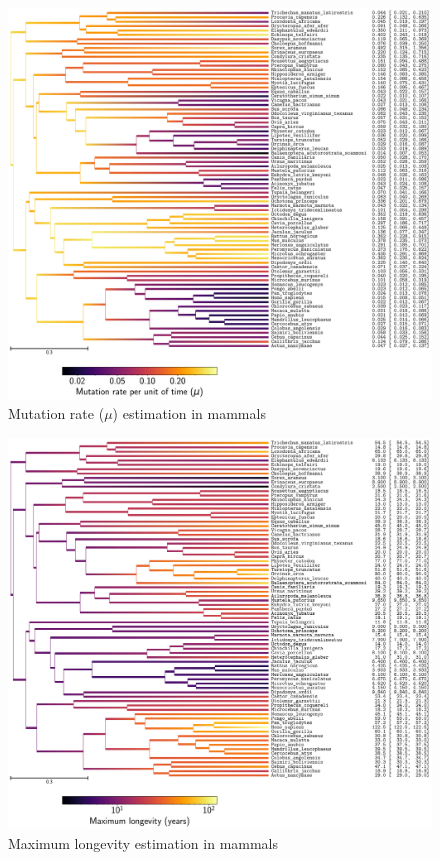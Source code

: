 \documentclass{article}
\begin{document}
	\begin{figure}[H]
		\centering
		\includegraphics[width=\linewidth, page=1]{mammals/18CDS_SiteMutSelBranchNe_R1_LogMutationRatePerTime}
		\caption[Mutation rate estimation in mammals]{Mutation rate ($\mu$) estimation in mammals}
	\end{figure}

	\begin{figure}[H]
		\centering
		\includegraphics[width=\linewidth, page=1]{mammals/18CDS_SiteMutSelBranchNe_R1_LogMaximum_longevity}
		\caption[Maximum longevity estimation in mammals]{Maximum longevity estimation in mammals}
	\end{figure}
\end{document}
